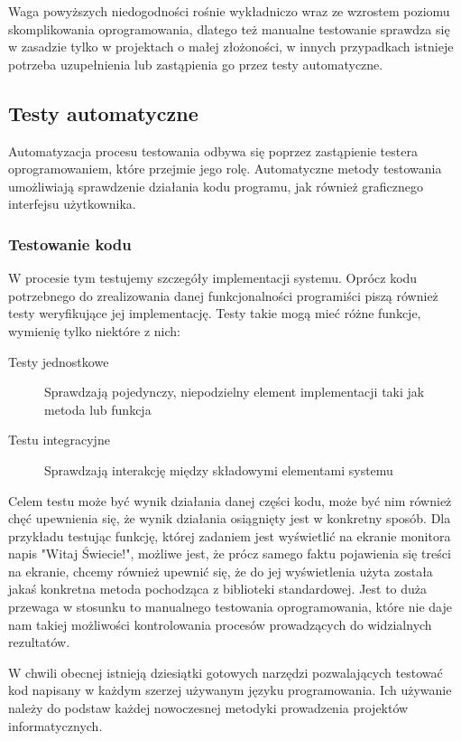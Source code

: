   	  Waga powyższych niedogodności rośnie wykładniczo wraz ze wzrostem poziomu skomplikowania oprogramowania, dlatego też manualne testowanie sprawdza się w zasadzie tylko w projektach o małej złożoności, w innych przypadkach istnieje potrzeba uzupełnienia lub zastąpienia go przez testy automatyczne.
	  
	  \subsection{Testy automatyczne}
	    Automatyzacja procesu testowania odbywa się poprzez zastąpienie testera oprogramowaniem, które przejmie jego rolę. Automatyczne metody testowania umożliwiają sprawdzenie działania kodu programu, jak również graficznego interfejsu użytkownika.
	    \subsubsection{Testowanie kodu}
	    
	      W procesie tym testujemy szczegóły implementacji systemu. Oprócz kodu potrzebnego do zrealizowania danej funkcjonalności programiści piszą również testy weryfikujące jej implementację. Testy takie mogą mieć różne funkcje, wymienię tylko niektóre z nich:
	      
	      \begin{description}
	        \item[Testy jednostkowe] Sprawdzają pojedynczy, niepodzielny element implementacji taki jak metoda lub funkcja
	        \item[Testu integracyjne] Sprawdzają interakcję między składowymi elementami systemu
        \end{description}
        
        Celem testu może być wynik działania danej części kodu, może być nim również chęć upewnienia się, że wynik działania osiągnięty jest w konkretny sposób. Dla przykładu testując funkcję, której zadaniem jest wyświetlić na ekranie monitora napis "Witaj Świecie!", możliwe jest, że prócz samego faktu pojawienia się treści na ekranie, chcemy również upewnić się, że do jej wyświetlenia użyta została jakaś konkretna metoda pochodząca z biblioteki standardowej. Jest to duża przewaga w stosunku to manualnego testowania oprogramowania, które nie daje nam takiej możliwości kontrolowania procesów prowadzących do widzialnych rezultatów.

        W chwili obecnej istnieją dziesiątki gotowych narzędzi pozwalających testować kod napisany w każdym szerzej używanym języku programowania. Ich używanie należy do podstaw każdej nowoczesnej metodyki prowadzenia projektów informatycznych.
        

